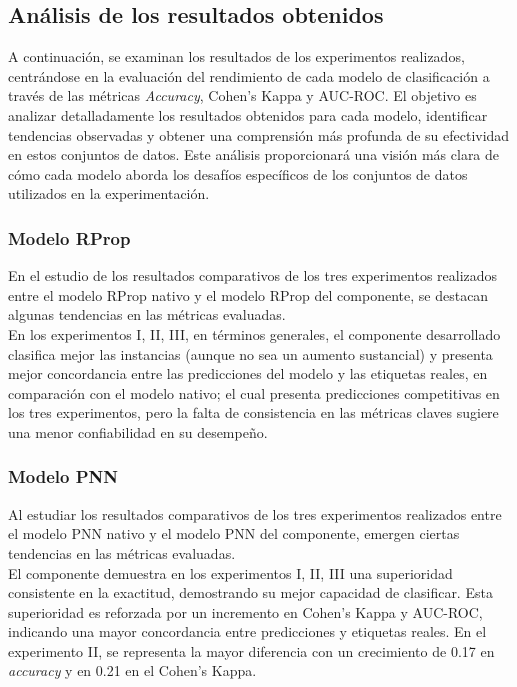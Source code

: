 \subsection{Análisis de los resultados obtenidos}
A continuación, se examinan los resultados de los experimentos realizados, centrándose en la evaluación del rendimiento de cada modelo de clasificación a través de las métricas \textit{Accuracy}, Cohen's Kappa y AUC-ROC. El objetivo es analizar detalladamente los resultados obtenidos para cada modelo, identificar tendencias observadas y obtener una comprensión más profunda de su efectividad en estos conjuntos de datos. Este análisis proporcionará una visión más clara de cómo cada modelo aborda los desafíos específicos de los conjuntos de datos utilizados en la experimentación.


\subsubsection*{Modelo RProp}
En el estudio de los resultados comparativos de los tres experimentos realizados entre el modelo RProp nativo y el modelo RProp del componente, se destacan algunas tendencias en las métricas evaluadas. \\
En los experimentos I, II, III, en términos generales, el componente desarrollado clasifica mejor las instancias (aunque no sea un aumento sustancial) y presenta mejor concordancia entre las predicciones del modelo y las etiquetas reales, en comparación con el modelo nativo; el cual presenta predicciones competitivas en los tres experimentos, pero la falta de consistencia en las métricas claves sugiere una menor confiabilidad en su desempeño.

\subsubsection*{Modelo PNN}
Al estudiar los resultados comparativos de los tres experimentos realizados entre el modelo PNN nativo y el modelo PNN del componente, emergen ciertas tendencias en las métricas evaluadas. \\
El componente demuestra en los experimentos I, II, III una superioridad consistente en la exactitud, demostrando su mejor capacidad de clasificar. Esta superioridad es reforzada por un incremento en Cohen's Kappa y AUC-ROC, indicando una mayor concordancia entre predicciones y etiquetas reales. En el experimento II, se representa la mayor diferencia con un crecimiento de 0.17 en \textit{accuracy} y en 0.21 en el Cohen's Kappa.

